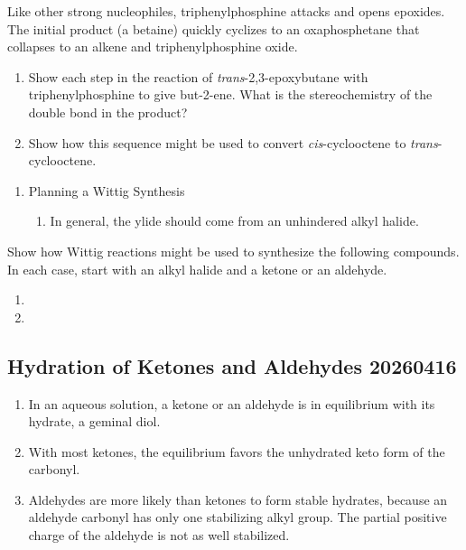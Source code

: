 \begin{example} %
    Like other strong nucleophiles, triphenylphosphine attacks and opens epoxides. The initial product (a betaine) quickly cyclizes to an oxaphosphetane that collapses to an alkene and triphenylphosphine oxide.
    \begin{enumerate}[label=(\alph*)]
        \item Show each step in the reaction of \textit{trans}-2,3-epoxybutane with triphenylphosphine to give but-2-ene. What is the stereochemistry of the double bond in the product?
        \item Show how this sequence might be used to convert \textit{cis}-cyclooctene to \textit{trans}-cyclooctene.
    \end{enumerate}
\end{example}

\begin{enumerate}[resume]
    \item Planning a Wittig Synthesis
    \begin{enumerate}
        \item In general, the ylide should come from an unhindered alkyl halide.
    \end{enumerate}
\end{enumerate}

\begin{example} %
    Show how Wittig reactions might be used to synthesize the following compounds. In each case, start with an alkyl halide and a ketone or an aldehyde.
    \begin{enumerate}[label=(\alph*)]
        \item {}
        \item {}
    \end{enumerate}
\end{example}

\subsection{Hydration of Ketones and Aldehydes 20260416}

\begin{enumerate}
    \item In an aqueous solution, a ketone or an aldehyde is in equilibrium with its hydrate, a geminal diol. %
    \item With most ketones, the equilibrium favors the unhydrated keto form of the carbonyl.
    \item Aldehydes are more likely than ketones to form stable hydrates, because an aldehyde carbonyl has only one stabilizing alkyl group. The partial positive charge of the aldehyde is not as well stabilized.
\end{enumerate}

